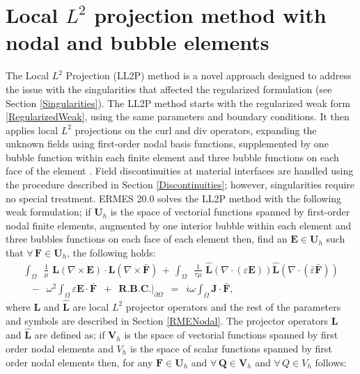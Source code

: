 \section{Local $L^{2}$ projection method with nodal and bubble elements}\label{LL2PNodalBubb}

The Local $L^{2}$ Projection (LL2P) method is a novel approach designed to address the issue with the singularities that affected the regularized formulation (see Section \ref{Singularities}). The LL2P method starts with the regularized weak form \eqref{RegularizedWeak}, using the same parameters and boundary conditions. It then applies local $L^{2}$ projections on the curl and div operators, expanding the unknown fields using first-order nodal basis functions, supplemented by one bubble function within each finite element and three bubble functions on each face of the element \cite{L2P-BE, L2P-BE-P}. Field discontinuities at material interfaces are handled using the procedure described in Section \ref{Discontinuities}; however, singularities require no special treatment. ERMES 20.0 solves the LL2P method with the following weak formulation; if $\mathbf{U}_{h}$ is the space of vectorial functions spanned by first-order nodal finite elements, augmented by one interior bubble within each element and three bubbles functions on each face of each element then, find an $\mathbf{E} \in \mathbf{U}_{h}$ such that $\forall\,\mathbf{F} \in \mathbf{U}_{h}$, the following holds:
\begin{equation}\label{LL2P-Weak}
	\begin{aligned}
		\int_{\Omega}\enspace\frac{1}{\mu}\,\,\mathbf{L}\left(\nabla\times\mathbf{E}\right)\cdot\mathbf{L}\left(\nabla\times\mathbf{\bar{F}}\right)\, + \,\int_{\Omega}\enspace\frac{1}{\tau\mu}\,\,\mathbf{\hat{L}}\left(\nabla\cdot\left(\varepsilon\mathbf{E}\right)\right)\mathbf{\hat{L}}\left(\nabla\cdot\left(\bar{\varepsilon}\mathbf{\bar{F}}\right)\right)
		\\
		\,\,\,\,-\enspace\omega^{2}\int_{\Omega}\varepsilon\mathbf{E}\cdot\mathbf{\bar{F}}\enspace + \enspace \textbf{R.B.C.}|_{\partial\Omega}\enspace = \enspace i\omega\int_{\Omega}\mathbf{J}\cdot\mathbf{\bar{F}},
	\end{aligned}
\end{equation}
where $\mathbf{L}$ and $\mathbf{\hat{L}}$ are local $L^{2}$ projector operators and the rest of the parameters and symbols are described in Section \ref{RMENodal}. The projector operators $\mathbf{L}$ and $\mathbf{\hat{L}}$ are defined as; if $\mathbf{V}_{h}$ is the space of vectorial functions spanned by first order nodal elements and $V_{h}$ is the space of scalar functions spanned by first order nodal elements then, for any $\mathbf{F} \in \mathbf{U}_{h}$ and $\forall\,\mathbf{Q} \in \mathbf{V}_{h}$ and $\forall\,Q \in {V}_{h}$ follows:
